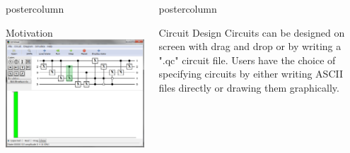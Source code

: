 \documentclass[final]{beamer} %
\begin{document}
\begin{frame}{}
\begin{columns}
\begin{column}{.33\textwidth}
\begin{beamercolorbox}[center,wd=\textwidth]{postercolumn}
\begin{minipage}[T]{.95\textwidth}
\begin{block}{\large Motivation}
             \centering 
             \includegraphics{figures/Motivation.png}
           \end{block}

         \end{minipage}
      \end{beamercolorbox}
    \end{column}

   \begin{column}{.33\textwidth}
      \begin{beamercolorbox}[center,wd=\textwidth]{postercolumn}
         \begin{minipage}[T]{.95\textwidth}
           \begin{block}{\large Circuit Design}
             Circuits can be designed on screen with drag and drop or by writing a ".qc" circuit file. Users have the choice of specifying circuits by either writing ASCII files directly or drawing them graphically. 


\end{block}
\end{minipage}
\end{beamercolorbox}
\end{column}
\end{columns}
\end{frame}
\end{document}
